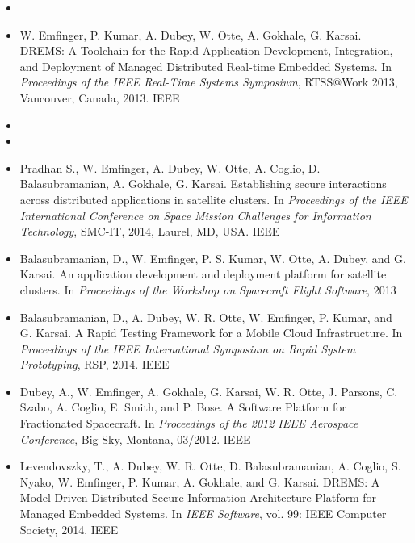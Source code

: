\begin{itemize}
  
	\item {}
	
	
	\item W. Emfinger, P. Kumar, A. Dubey, W. Otte, A. Gokhale, G. Karsai. DREMS: A Toolchain for the Rapid Application Development, Integration, and Deployment of Managed Distributed Real-time Embedded Systems. In \textit{Proceedings of the IEEE Real-Time Systems Symposium}, RTSS@Work 2013, Vancouver, Canada, 2013. IEEE
	
        \item {}

        \item {}
	
	
	\item Pradhan S., W. Emfinger, A. Dubey, W. Otte, A. Coglio, D. Balasubramanian, A. Gokhale, G. Karsai. Establishing secure interactions across distributed applications in satellite clusters. In \textit{Proceedings of the IEEE International Conference on Space Mission Challenges for Information Technology}, SMC-IT, 2014, Laurel, MD, USA. IEEE
	
	
	\item Balasubramanian, D., W. Emfinger, P. S. Kumar, W. Otte, A. Dubey, and G. Karsai. An application development and deployment platform for satellite clusters.  In \textit { Proceedings of the Workshop on Spacecraft Flight Software}, 2013
	
	\item Balasubramanian, D., A. Dubey, W. R. Otte, W. Emfinger, P. Kumar, and G. Karsai. A Rapid Testing Framework for a Mobile Cloud Infrastructure.  In \textit{Proceedings of the IEEE International Symposium on Rapid System Prototyping}, RSP, 2014. IEEE
	
	\item Dubey, A., W. Emfinger, A. Gokhale, G. Karsai, W. R. Otte, J. Parsons, C. Szabo, A. Coglio, E. Smith, and P. Bose. A Software Platform for Fractionated Spacecraft. In \textit{Proceedings of the 2012 IEEE Aerospace Conference}, Big Sky, Montana, 03/2012. IEEE
	
	\item Levendovszky, T., A. Dubey, W. R. Otte, D. Balasubramanian, A. Coglio, S. Nyako, W. Emfinger, P. Kumar, A. Gokhale, and G. Karsai. DREMS: A Model-Driven Distributed Secure Information Architecture Platform for Managed Embedded Systems. In \textit{IEEE Software}, vol. 99: IEEE Computer Society, 2014. IEEE
	
\end{itemize}

